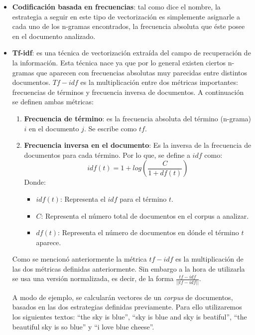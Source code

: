     \begin{itemize}
        \item \textbf{Codificación basada en frecuencias}: tal como dice el nombre, la estrategia a seguir en este tipo de vectorización es simplemente asignarle a cada uno de los n-gramas encontrados, la frecuencia absoluta que éste posee en el documento analizado.
        \item \textbf{Tf-idf}: es una técnica de vectorización extraída del campo de recuperación de la información. Esta técnica nace ya que por lo general existen ciertos n-gramas que aparecen con frecuencias absolutas muy parecidas entre distintos documentos. $Tf-idf$ es la multiplicación entre dos métricas importantes: frecuencias de términos y frecuencia inversa de documentos. A continuación se definen ambas métricas:
        \begin{enumerate}
            \item \textbf{Frecuencia de término}: es la frecuencia absoluta del término (n-grama) $i$ en el documento $j$. Se escribe como $tf$.
            \item \textbf{Frecuencia inversa en el documento}: Es la inversa de la frecuencia de documentos para cada término. Por lo que, se define a $idf$ como:
            \begin{equation*}
                idf(t) = 1+ log \left(\frac{C}{1+df(t)}\right)
            \end{equation*}
            Donde:
            \begin{itemize}
                \item $idf(t)$: Representa el $idf$ para el término $t$.
                \item $C$: Representa el número total de documentos en el corpus a analizar.
                \item $df(t)$: Representa el número de documentos en dónde el término $t$ aparece.
            \end{itemize}
    \end{enumerate}
    Como se mencionó anteriormente la métrica $tf-idf$ es la multiplicación de las dos métricas definidas anteriormente. Sin embargo a la hora de utilizarla se usa una versión normalizada, es decir, de la forma $\frac{tf-idf}{||tf-idf||}$.
   
    A modo de ejemplo, se calcularán vectores de un \textit{corpus} de documentos, basados en las dos estrategias definidas previamente. Para ello utilizaremos los siguientes textos: ``the sky is blue'', ``sky is blue and sky is beatiful'', ``the beautiful sky is so blue'' y ``i love blue cheese''.
    

\end{itemize}
